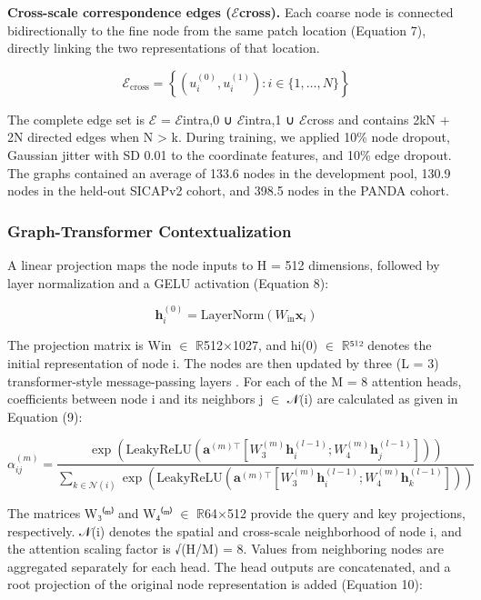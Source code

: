 \documentclass[11pt,a4paper]{article}
\begin{document}
\noindent \textbf{Cross-scale correspondence edges ($\mathcal{E}$cross).} Each coarse node is connected bidirectionally to the fine node from the same patch location (Equation 7), directly linking the two representations of that location.


\begin{equation}
\mathcal{E}_{\text{cross}} = \left\{ (u_i^{(0)}, u_i^{(1)}) : i \in \{1, \dots, N\} \right\}
\label{eq:cross_edges}
\end{equation}

The complete edge set is $\mathcal{E}$ = $\mathcal{E}$intra,0 ∪ $\mathcal{E}$intra,1 ∪ $\mathcal{E}$cross and contains 2kN + 2N directed edges when N > k. During training, we applied 10\% node dropout, Gaussian jitter with SD 0.01 to the coordinate features, and 10\% edge dropout. The graphs contained an average of 133.6 nodes in the development pool, 130.9 nodes in the held-out SICAPv2 cohort, and 398.5 nodes in the PANDA cohort.


\subsubsection{Graph-Transformer Contextualization}
A linear projection maps the node inputs to H = 512 dimensions, followed by layer normalization and a GELU activation (Equation 8):


\begin{equation}
\mathbf{h}_i^{(0)} = \text{LayerNorm}(W_{\text{in}} \mathbf{x}_i)
\label{eq:proj}
\end{equation}

The projection matrix is Win $\in$ $\mathbb{R}$512$\times$1027, and hi(0) $\in$ $\mathbb{R}$⁵¹² denotes the initial representation of node i. The nodes are then updated by three (L = 3) transformer-style message-passing layers \cite{ref24, ref25}. For each of the M = 8 attention heads, coefficients between node i and its neighbors j $\in$ 𝒩(i) are calculated as given in Equation (9):


\begin{equation}
\alpha_{ij}^{(m)} = \frac{\exp\left(\text{LeakyReLU}\left(\mathbf{a}^{(m)\top} [W_3^{(m)} \mathbf{h}_i^{(l-1)}; W_4^{(m)} \mathbf{h}_j^{(l-1)}]\right)\right)}{\sum_{k \in \mathcal{N}(i)} \exp\left(\text{LeakyReLU}\left(\mathbf{a}^{(m)\top} [W_3^{(m)} \mathbf{h}_i^{(l-1)}; W_4^{(m)} \mathbf{h}_k^{(l-1)}]\right)\right)}
\label{eq:attn}
\end{equation}

The matrices W₃⁽ᵐ⁾ and W₄⁽ᵐ⁾ $\in$ $\mathbb{R}$64$\times$512 provide the query and key projections, respectively. 𝒩(i) denotes the spatial and cross-scale neighborhood of node i, and the attention scaling factor is √(H/M) = 8. Values from neighboring nodes are aggregated separately for each head. The head outputs are concatenated, and a root projection of the original node representation is added (Equation 10):
\end{document}
